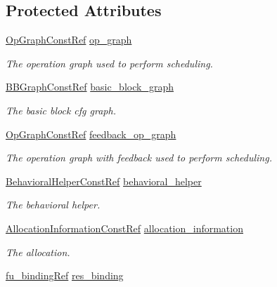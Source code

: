 \subsection*{Protected Attributes}
\begin{DoxyCompactItemize}
\item 
\hyperlink{op__graph_8hpp_a9a0b240622c47584bee6951a6f5de746}{Op\+Graph\+Const\+Ref} \hyperlink{classSDCScheduling_acad9a2e9882b3b4e795008f1c2f412d8}{op\+\_\+graph}
\begin{DoxyCompactList}\small\item\em The operation graph used to perform scheduling. \end{DoxyCompactList}\item 
\hyperlink{basic__block_8hpp_ab66bdbde3a29e41d079d8a320af9c921}{B\+B\+Graph\+Const\+Ref} \hyperlink{classSDCScheduling_a8b1faca802e0fdba5802b2a36e2129fc}{basic\+\_\+block\+\_\+graph}
\begin{DoxyCompactList}\small\item\em The basic block cfg graph. \end{DoxyCompactList}\item 
\hyperlink{op__graph_8hpp_a9a0b240622c47584bee6951a6f5de746}{Op\+Graph\+Const\+Ref} \hyperlink{classSDCScheduling_a81eb66c6269c6d47e758cdd9cb5d0394}{feedback\+\_\+op\+\_\+graph}
\begin{DoxyCompactList}\small\item\em The operation graph with feedback used to perform scheduling. \end{DoxyCompactList}\item 
\hyperlink{behavioral__helper_8hpp_aae973b54cac87eef3b27442aa3e1e425}{Behavioral\+Helper\+Const\+Ref} \hyperlink{classSDCScheduling_a1a6c5e7876d16458e880b67554d5fbe8}{behavioral\+\_\+helper}
\begin{DoxyCompactList}\small\item\em The behavioral helper. \end{DoxyCompactList}\item 
\hyperlink{allocation__information_8hpp_a54287618a63bf87e31ddb17ba01e7ca7}{Allocation\+Information\+Const\+Ref} \hyperlink{classSDCScheduling_a24d76430568b1aa0a5b27ea46c8ebe47}{allocation\+\_\+information}
\begin{DoxyCompactList}\small\item\em The allocation. \end{DoxyCompactList}\item 
\hyperlink{fu__binding_8hpp_a619181df8ab98d7b7e17de58ac44b065}{fu\+\_\+binding\+Ref} \hyperlink{classSDCScheduling_af2ac518cfdb99a49305bf28c878af96f}{res\+\_\+binding}

\end{DoxyCompactItemize}
